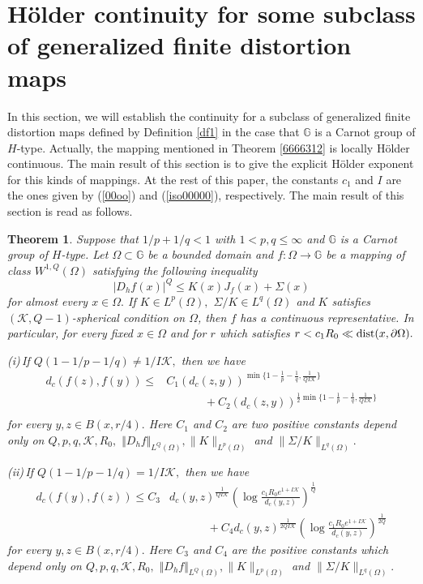 \documentclass[11pt,twoside]{article}
\newtheorem{thm}{Theorem}[section]
\theoremstyle{definition}
\theoremstyle{remark}
\begin{document}
 \section{H\"{o}lder continuity for some subclass of generalized finite distortion maps}\label{sec255555}
In this section, we will establish  the continuity for a subclass of generalized finite distortion maps defined by Definition \ref{df1} in the case that $\mathbb{G}$ is a Carnot group of $H$-type. Actually, the mapping mentioned in Theorem  \ref{6666312} is locally H\"{o}lder continuous. The main result of this section is to give the explicit H\"{o}lder exponent for this kinds of mappings.  At the rest of this paper,  the constants $c_{1}$ and $I$ are the ones given by  (\ref{00oo}) and (\ref{iso00000}), respectively. The main result of this section is read as follows.
\begin{thm}\label{thm20}
Suppose that  $1/p+1/q<1$ with $1<p,q\leq\infty$ and $\mathbb{G}$ is a Carnot group of $H$-type. Let $\Omega\subset\mathbb{G}$ be a bounded domain and $f:\Omega\rightarrow \mathbb{G}$ be a mapping of class $W^{1,Q}(\Omega)$ satisfying  the following inequality
$$\vert D_{h}f(x)\vert^{Q}\leq K(x)J_{f}(x)+\Sigma(x)$$
for almost every $x\in\Omega.$ If $K\in L^{p}(\Omega),$ $\Sigma/K\in L^{q}(\Omega)$ and $K$ satisfies $(\mathcal{K},Q-1)$-spherical condition on $\Omega$, then $f$ has a continuous representative.
In particular,  for every fixed $x\in\Omega$ and for $r$ which satisfies $r<c_{1} R_{0}\ll{\rm dist}(x,\partial\Omega).$

(i)\,If $Q(1-1/p-1/q)\neq1/I\mathcal{K},$  then we have
 \begin{equation}
 \begin{aligned}
d_{c}(f(z),f(y))
\leq &C_{1}(d_{c}(z,y))^{\min\Big\{1-\frac{1}{p}-\frac{1}{q},\frac{1}{QI\mathcal{K}}\Big\}}\\
&\,\,\,\,\,\,\,\,\,\,\,\,\,\,\,\,\,\,\,\,+C_{2}(d_{c}(z,y))^{\frac{1}{2}\min\Big\{1-\frac{1}{p}-\frac{1}{q},\frac{1}{QI\mathcal{K}}\Big\}}\\
\end{aligned}
\end{equation}
for every $y,z\in B(x,r/4).$  Here $C_{1}$ and $C_{2}$ are two positive constants depend only on $Q, p, q,\mathcal{K}, R_{0},$ $
\Vert D_{h}f\Vert_{L^{Q}(\Omega)}, \|K\|_{L^{p}(\Omega)}$ and $\|\Sigma/K\|_{L^{q}(\Omega)}.$  

(ii)\,If $Q(1-1/p-1/q)=1/I\mathcal{K},$ then we have 
  \begin{equation}
\begin{aligned}
d_{c}(f(y),f(z))\leq C_{3}&d_{c}(y,z)^{\frac{1}{QI\mathcal{K}}}\left(\log\frac{c_{1}R_{0}e^{1+I\mathcal{K}}}{d_{c}(y,z)}\right)^{\frac{1}{Q}}\\
&\,\,\,\,\,\,\,\,\,\,\,\,\,\,\,\,\,\,\,\,+C_{4}d_{c}(y,z)^{\frac{1}{2QI\mathcal{K}}}\left(\log\frac{c_{1}R_{0}e^{1+I\mathcal{K}}}{d_{c}(y,z)}\right)^{\frac{1}{2Q}}
\end{aligned}
\end{equation}
for every $y,z\in B(x,r/4).$   Here $C_{3}$ and $C_{4}$ are the positive constants which depend only on $Q, p, q,\mathcal{K}, R_{0},$ $
\Vert D_{h}f\Vert_{L^{Q}(\Omega)}, \|K\|_{L^{p}(\Omega)}$ and $\|\Sigma/K\|_{L^{q}(\Omega)}.$  
\end{thm}
\end{document}
